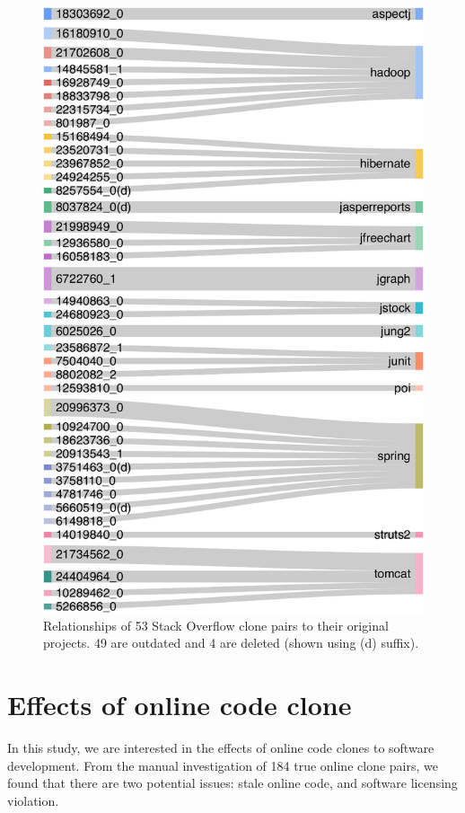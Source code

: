 \documentclass{sig-alternate-05-2015}
\begin{document}
\begin{figure}
	\centering
	\includegraphics[width=0.9\linewidth]{Sankey_proj}
	\caption{Relationships of 53 Stack Overflow clone pairs to their original projects. 49 are outdated and 4 are deleted (shown using (d) suffix).}
	\label{fig:sankey}
\end{figure}


\section{Effects of online code clone}

In this study, we are interested in the effects of online code clones to software development. From the manual investigation of 184 true online clone pairs, we found that there are two potential issues: stale online code, and software licensing violation.
\end{document}
